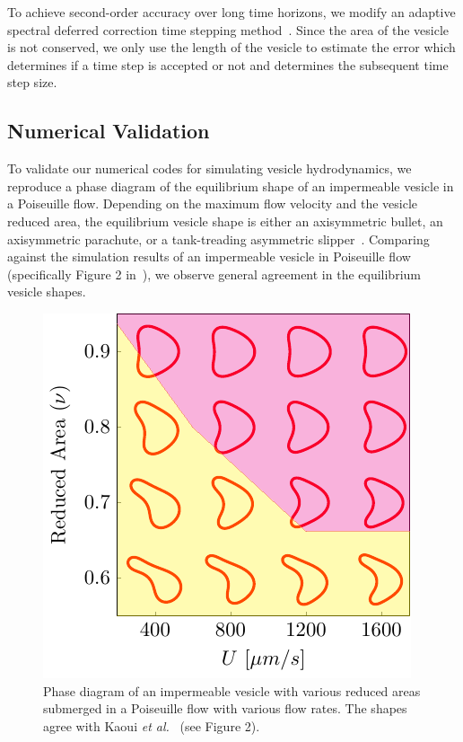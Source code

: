 \documentclass[prb,preprint,showpacs,preprintnumbers,amsmath,amssymb,longbibliography]{revtex4-1}
\newif\ifTikz
\begin{document}
To achieve second-order accuracy over long time horizons, we modify an
adaptive spectral deferred correction time stepping
method~\cite{qua-bir2016}. Since the area of the vesicle is not
conserved, we only use the length of the vesicle to estimate the error
which determines if a time step is accepted or not and determines the
subsequent time step size.

\subsection{Numerical Validation\label{subsec:numerical_validation}}
To validate our numerical codes for simulating vesicle hydrodynamics, we
reproduce a phase diagram of the equilibrium shape of an impermeable
vesicle in a Poiseuille flow. Depending on the maximum flow velocity and
the vesicle reduced area, the equilibrium vesicle shape is either an
axisymmetric bullet, an axisymmetric parachute, or a tank-treading
asymmetric slipper~\cite{kao-bir-mis2009}. Comparing against the
simulation results of an impermeable vesicle in Poiseuille flow
(specifically Figure 2 in~\citet{kao-bir-mis2009}), we observe general
agreement in the equilibrium vesicle shapes.

\begin{figure}[htp]
  \centering
  \ifTikz
  
  \else
  \includegraphics{figures/parabolicImpermeable.pdf}
  \fi
  \caption{\label{fig:PoiseuillePhase} Phase diagram of an impermeable
  vesicle with various reduced areas submerged in a Poiseuille flow with
  various flow rates. The shapes agree with Kaoui {\em et
  al.}~\cite{kao-bir-mis2009} (see Figure 2).}
\end{figure}
\end{document}
